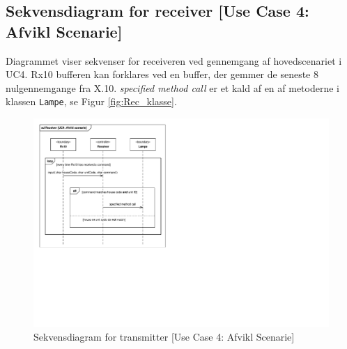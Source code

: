 \clearpage

\subsection{Sekvensdiagram for receiver [Use Case 4: Afvikl Scenarie]}
Diagrammet viser sekvenser for receiveren ved gennemgang af hovedscenariet i UC4. Rx10 bufferen kan forklares ved en buffer, der gemmer de seneste 8 nulgennemgange fra X.10. \emph{specified method call} er et kald af en af metoderne i klassen \texttt{Lampe}, se Figur \ref{fig:Rec_klasse}.

\begin{figure}[h]
	\centering 
	\includegraphics[scale=1,trim=17 225 465 17, clip=true]{Systemarkitektur/Diagrammer/Receiver_UC4_Sekvens.pdf}
	\caption{Sekvensdiagram for transmitter [Use Case 4: Afvikl Scenarie]}
	\label{fig:Rec_UC3Sek}
\end{figure}

\clearpage

